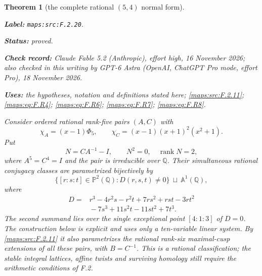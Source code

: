 \documentclass[11pt,a4paper]{article}
\newtheorem{theorem}{Theorem}[section]
\theoremstyle{definition}
\newcommand{\StatementRecord}[4]{\par\smallskip\begingroup\upshape\raggedright\noindent\textbf{Label:} \nolinkurl{#1}.\par\noindent\textbf{Status:} #2.\par\noindent\textbf{Check record:} #3.\par\noindent\textbf{Uses:} #4.\par\endgroup\smallskip}
\newcommand{\CurrentChecker}{GPT-6 Astra (OpenAI, ChatGPT Pro mode, effort Pro), 18 November 2026}
\begin{document}
\begin{theorem}[the complete rational $(5,4)$ normal form]\label{maps:src:F.2.20}
\StatementRecord{maps:src:F.2.20}{proved}{Claude Fable 5.2 (Anthropic), effort high, 16 November 2026; also checked in this writing by \CurrentChecker}{the hypotheses, notation and definitions stated here; \cref{maps:src:F.2.11}; \cref{maps:eq:F.R4}; \cref{maps:eq:F.R6}; \cref{maps:eq:F.R7}; \cref{maps:eq:F.R8}}


Consider ordered rational rank-five pairs $(A,C)$ with
\[
 \chi_A=(x-1)\Phi_5,
 \qquad \chi_C=(x-1)(x+1)^2(x^2+1).
\]
Put
\[
 N=CA^{-1}-I,
 \qquad N^2=0,\quad\operatorname{rank}N=2,
\]
where $A^5=C^4=I$ and the pair is irreducible over $\mathbb Q$.
Their simultaneous rational conjugacy classes are parametrized
bijectively by
\[
 \bigl\{[r:s:t]\in\mathbb P^2(\mathbb Q):D(r,s,t)\ne0\bigr\}
 \ \sqcup\ \mathbb A^1(\mathbb Q),
 \tag{F.R1}\label{maps:eq:F.R1}
\]
where
\[
\begin{split}
 D={}&r^3-4r^2s-r^2t+7rs^2+rst-3rt^2\\
     &{}-7s^3+11s^2t-11st^2+7t^3.
\end{split}
 \tag{F.R2}\label{maps:eq:F.R2}
\]
The second summand lies over the single exceptional point
$[4:1:3]$ of $D=0$.  The construction below is explicit and
uses only a ten-variable linear system.  By \ref{maps:src:F.2.11} it also
parametrizes the rational rank-six maximal-cusp extensions
of all these pairs, with $B=C^{-1}$.
This is a rational classification; the stable integral
lattices, affine twists and surviving homology still require
the arithmetic conditions of F.2.

\end{theorem}
\end{document}
